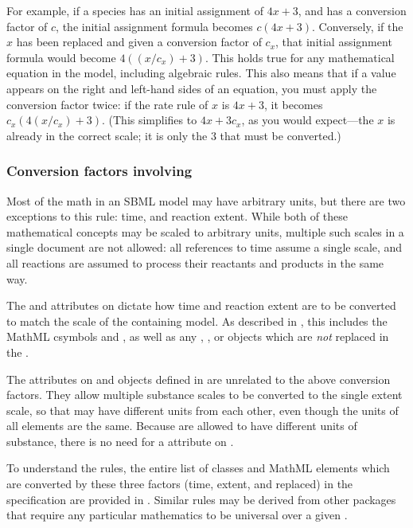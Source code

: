 For example, if a species has an initial assignment of $4x + 3$, and has
a conversion factor of $c$, the initial assignment formula becomes
$c (4x+3)$.  Conversely, if the $x$ has
been replaced and given a conversion factor of $c_x$, that initial
assignment formula would become $4((x/c_x)+3)$.  This holds true for any
mathematical equation in the model, including algebraic rules.  This
also means that if a value appears on the right and left-hand sides of
an equation, you must apply the conversion factor twice: if the rate
rule of $x$ is $4x+3$, it becomes $c_x(4(x/c_x) + 3)$.  (This
simplifies to $4x + 3c_x$, as you would expect---the $x$ is already in
the correct scale; it is only the $3$ that must be converted.)



\subsubsection{Conversion factors involving }

Most of the math in an SBML model may have arbitrary units, but there are
two exceptions to this rule:  time, and reaction extent.  While both of
these mathematical concepts may be scaled to arbitrary units, multiple
such scales in a single document are not allowed:  all references to
time assume a single scale, and all reactions are assumed to process
their reactants and products in the same way.

The  and  attributes 
on \Submodel dictate how time and reaction extent are to be converted to 
match the scale of the containing model.  As described in 
,
this includes the MathML csymbols
 and , as well as any \Delay, \KineticLaw, or
\RateRule objects which are \emph{not} replaced in the \Submodel.

The  attributes on \Species and \Model objects defined
in \sbmlthreecore are unrelated to the above conversion factors.  They
allow multiple substance scales to be converted to the single extent scale, so that
\Species may have different units from each other, even though the units of all
\KineticLaw elements are the same.  Because \Species are allowed to have different
units of substance, there is no need for a 
attribute on \Submodel.

To understand the rules, the entire list of classes and MathML elements
which are converted by these three factors (time, extent, and
replaced) in the \sbmlthreecore specification are provided
in .  Similar rules may be derived from other
packages that require any particular mathematics to be universal over 
a given \Model.

